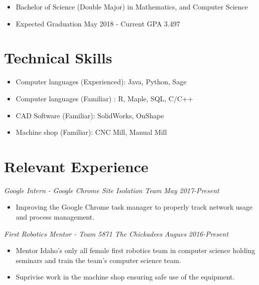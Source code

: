 \documentclass[letterpaper]{article}
\begin{document}
\begin{itemize}
\item Bachelor of Science (Double Major) in  Mathematics, and Computer Science


\item Expected Graduation May 2018 - Current GPA 3.497
\end{itemize}

\vspace{.10in}
\section*{Technical Skills}
\begin{itemize}
\item Computer languages (Experienced): Java, Python, Sage 
\item Computer languages (Familiar) : R, Maple, SQL, C/C++
\item CAD Software (Familiar): SolidWorks, OnShape
\item Machine shop (Familiar): CNC Mill, Manual Mill
\end{itemize}

\vspace{.10in}
\section*{Relevant Experience}

\begin{multicols}{2}
\textit{Google Intern - Google Chrome Site Isolation Team}
\vfill
\columnbreak
\textit{May 2017-Present}
\end{multicols}
\begin{itemize}
    \item Improving the Google Chrome task manager to properly track network usage and process management.
\end{itemize}

\vspace{.10in}

\begin{multicols}{2}
\textit{First Robotics Mentor - Team 5871 The Chickadees}
\vfill
\columnbreak
\textit{Augues 2016-Present}
\end{multicols}
\begin{itemize}
    \item Mentor Idaho's only all female first robotics team in computer science holding seminars
        and train the team's computer science team.
    \item Suprivise work in the machine shop ensuring safe use of the equipment. 
\end{itemize}
\end{document}
